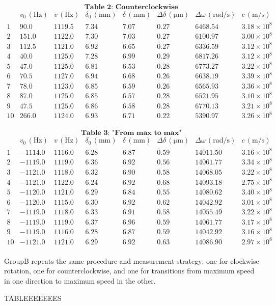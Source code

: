 \[
\textbf{Table 2: Counterclockwise } 
\]
\[
\begin{array}{c|c|c|c|c|c|c|c}
\text{} 
& v_{0}\,(\text{Hz})
& v\,(\text{Hz})
& \delta_{0}\,(\mathrm{mm})
& \delta\,(\mathrm{mm})
& \Delta \delta\,(\mathrm{\mu m})
& \Delta \omega\,(\mathrm{rad/s})
& c\,(\mathrm{m/s})
\\ \hline
1 & 90.0 & 1119.5 & 7.34 & 7.07 & 0.27 & 6468.54 & 3.18\times10^{8} \\
2 & 151.0 & 1122.0 & 7.30 & 7.03 & 0.27 & 6100.97 & 3.00\times10^{8} \\
3 & 112.5 & 1121.0 & 6.92 & 6.65 & 0.27 & 6336.59 & 3.12\times10^{8} \\
4 & 40.0 & 1125.0 & 7.28 & 6.99 & 0.29 & 6817.26 & 3.12\times10^{8} \\
5 & 47.0 & 1125.0 & 6.81 & 6.53 & 0.28 & 6773.27 & 3.22\times10^{8} \\
6 & 70.5 & 1127.0 & 6.94 & 6.68 & 0.26 & 6638.19 & 3.39\times10^{8} \\
7 & 78.0 & 1123.0 & 6.85 & 6.59 & 0.26 & 6565.93 & 3.36\times10^{8} \\
8 & 87.0 & 1125.0 & 6.85 & 6.57 & 0.28 & 6521.95 & 3.10\times10^{8} \\
9 & 47.5 & 1125.0 & 6.86 & 6.58 & 0.28 & 6770.13 & 3.21\times10^{8} \\
10 & 266.0 & 1124.0 & 6.93 & 6.71 & 0.22 & 5390.97 & 3.26\times10^{8} \\
\end{array}
\]

\[
\textbf{Table 3: "From max to max" } 
\]
\[
\begin{array}{c|c|c|c|c|c|c|c}
\text{} 
& v_{0}\,(\text{Hz})
& v\,(\text{Hz})
& \delta_{0}\,(\mathrm{mm})
& \delta\,(\mathrm{mm})
& \Delta \delta\,(\mathrm{\mu m})
& \Delta \omega\,(\mathrm{rad/s})
& c\,(\mathrm{m/s})
\\ \hline
1 & -1114.0 & 1116.0 & 6.28 & 6.87 & 0.59 & 14011.50 & 3.16\times10^{8} \\
2 & -1119.0 & 1119.0 & 6.36 & 6.92 & 0.56 & 14061.77 & 3.34\times10^{8} \\
3 & -1121.0 & 1118.0 & 6.32 & 6.90 & 0.58 & 14068.05 & 3.22\times10^{8} \\
4 & -1121.0 & 1122.0 & 6.24 & 6.92 & 0.68 & 14093.18 & 2.75\times10^{8} \\
5 & -1120.0 & 1121.0 & 6.29 & 6.84 & 0.55 & 14080.62 & 3.40\times10^{8} \\
6 & -1120.0 & 1115.0 & 6.30 & 6.92 & 0.62 & 14042.92 & 3.01\times10^{8} \\
7 & -1119.0 & 1118.0 & 6.33 & 6.91 & 0.58 & 14055.49 & 3.22\times10^{8} \\
8 & -1119.0 & 1119.0 & 6.37 & 6.96 & 0.59 & 14061.77 & 3.17\times10^{8} \\
9 & -1119.0 & 1116.0 & 6.28 & 6.87 & 0.59 & 14042.92 & 3.16\times10^{8} \\
10 & -1121.0 & 1121.0 & 6.29 & 6.92 & 0.63 & 14086.90 & 2.97\times10^{8} \\
\end{array}
\]

GroupB repeats the same procedure and measurement strategy: one for clockwise rotation, one for counterclockwise, and one for transitions from maximum speed in one direction to maximum speed in the other.


TABLEEEEEEES
